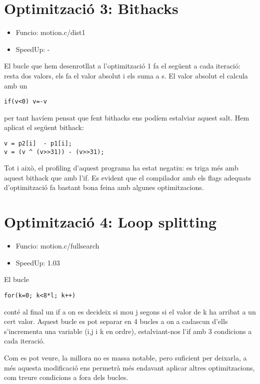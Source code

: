 \section{Optimitzaci\'o 3: Bithacks}
\begin{itemize}
\item{Funcio: motion.c/dist1}
\item{SpeedUp: -}
\end{itemize}

El bucle que hem desenrotllat a l'optimització 1 fa el següent a cada iteració: resta dos valors, els fa el valor absolut i els suma a s. El valor absolut el calcula amb un 

\begin{lstlisting}
if(v<0) v=-v 
\end{lstlisting}

per tant havíem pensat que fent bithacks ens podíem estalviar aquest salt. Hem aplicat el següent bithack:

\begin{lstlisting}
v = p2[i]  - p1[i];
v = (v ^ (v>>31)) - (v>>31);
\end{lstlisting}
 

Tot i això, el profiling d'aquest programa ha estat negatiu: es triga més amb aquest bithack que amb l'if. Es evident que el compilador amb els flags adequats d'optimització fa bastant bona feina amb algunes optimitzacions.
              

\section{Optimitzaci\'o 4: Loop splitting}
\begin{itemize}
\item{Funcio: motion.c/fullsearch}
\item{SpeedUp: 1.03}
\end{itemize}

El bucle 

\begin{lstlisting}
for(k=0; k<8*l; k++)
\end{lstlisting}

conté al final un if a on es decideix si mou j segons si el valor de k ha arribat a un cert valor. Aquest bucle es pot separar en 4 bucles a on a cadascun d'ells s'incrementa una variable (i,j i k en ordre), estalviant-nos l'if amb 3 condicions a cada iteració.

Com es pot veure, la millora no es massa notable, pero suficient per deixarla, a més aquesta modificació ens permetrà més endavant aplicar altres optimitzacions, com treure condicions a fora dels bucles.

